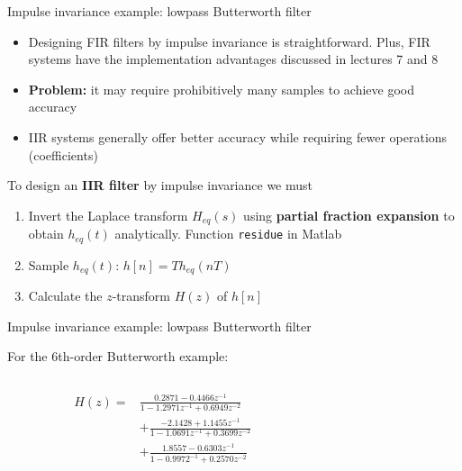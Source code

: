 \documentclass[10pt]{beamer}
\begin{document}
%
\begin{frame}{Impulse invariance example: lowpass Butterworth filter}

\begin{itemize}
	\item Designing FIR filters by impulse invariance is straightforward. Plus, FIR systems have the implementation advantages discussed in lectures 7 and 8
	\item \textbf{Problem:} it may require prohibitively many samples to achieve good accuracy
	\item IIR systems generally offer better accuracy while requiring fewer operations (coefficients)
\end{itemize}

To design an \textbf{IIR filter} by impulse invariance we must

\begin{enumerate}
	\item Invert the Laplace transform $H_{eq}(s)$ using \textbf{partial fraction expansion} to obtain $h_{eq}(t)$ analytically. Function \texttt{residue} in Matlab	
	\item Sample $h_{eq}(t)$: $h[n] = Th_{eq}(nT)$
	\item Calculate the $z$-transform $H(z)$ of $h[n]$
\end{enumerate}
\end{frame}


%
\begin{frame}{Impulse invariance example: lowpass Butterworth filter}

For the 6th-order Butterworth example:

\begin{columns}
	\begin{column}{0.5\textwidth}
		\begin{align*}
		H(z) =& \frac{0.2871 -0.4466z^{-1}}{1 -1.2971z^{-1} + 0.6949z^{-2}} \\ &+\frac{-2.1428 +1.1455z^{-1}}{1 -1.0691z^{-1} + 0.3699z^{-2}}  \\
		&+\frac{1.8557 - 0.6303z^{-1}}{1 -0.9972^{-1} + 0.2570z^{-2}} 
		\end{align*}
	\end{column}
	
	\begin{column}{0.5\textwidth}
		\begin{center}
			\resizebox{\linewidth}{!}{}
		\end{center}
	\end{column}
\end{columns}
\end{frame}
\end{document}
